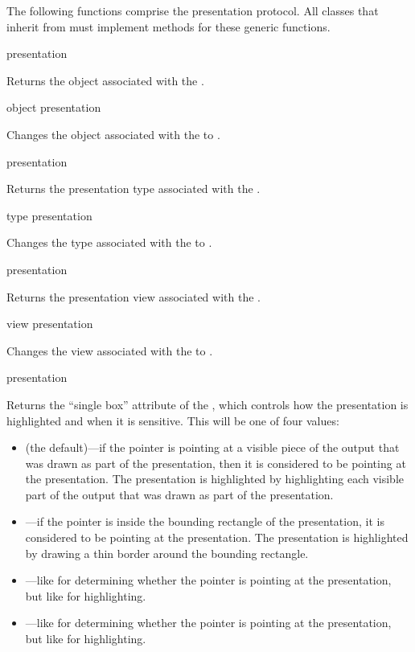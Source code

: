 The following functions comprise the presentation protocol.  All classes that
inherit from  must implement methods for these generic
functions.

 {presentation}

Returns the object associated with the  .

 {object presentation}

Changes the object associated with the   to
.

 {presentation}

Returns the presentation type associated with the 
.

 {type presentation}

Changes the type associated with the   to
.

 {presentation}

Returns the presentation view associated with the 
.

 {view presentation}

Changes the view associated with the   to
.

 {presentation}

Returns the ``single box'' attribute of the 
, which controls how the presentation is highlighted and when
it is sensitive.  This will be one of four values:

\begin{itemize}
\item {} (the default)---if the pointer is pointing at a visible piece of
the output that was drawn as part of the presentation, then it is considered to
be pointing at the presentation.  The presentation is highlighted by
highlighting each visible part of the output that was drawn as part of the
presentation.

\item {}---if the pointer is inside the bounding rectangle of the
presentation, it is considered to be pointing at the presentation.  The
presentation is highlighted by drawing a thin border around the bounding
rectangle.

\item {}---like  for determining whether the pointer is
pointing at the presentation, but like  for highlighting.

\item {}---like  for determining whether the pointer is
pointing at the presentation, but like  for highlighting.
\end{itemize}

